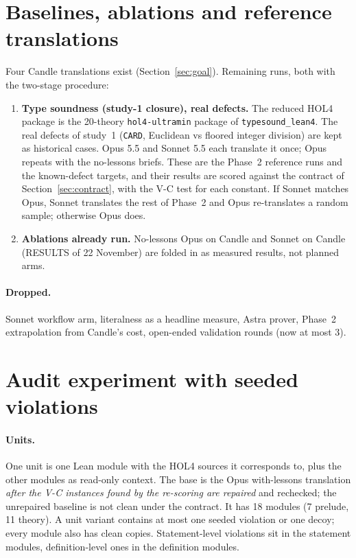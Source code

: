 \documentclass[11pt,a4paper]{article}
\newcommand{\code}[1]{\texttt{#1}}
\begin{document}
\section{Baselines, ablations and reference translations}\label{sec:ablation}
Four Candle translations exist (Section~\ref{sec:goal}). Remaining runs, both with the two-stage procedure:
\begin{enumerate}
\item \textbf{Type soundness (study-1 closure), real defects.} The reduced HOL4 package is the 20-theory \code{hol4-ultramin} package of \code{typesound\_lean4}. The real defects of study~1 (\code{CARD}, Euclidean vs floored integer division) are kept as historical cases. Opus 5.5 and Sonnet 5.5 each translate it once; Opus repeats with the no-lessons briefs. These are the Phase~2 reference runs and the known-defect targets, and their results are scored against the contract of Section~\ref{sec:contract}, with the V-C test for each constant. If Sonnet matches Opus, Sonnet translates the rest of Phase~2 and Opus re-translates a random sample; otherwise Opus does.
\item \textbf{Ablations already run.} No-lessons Opus on Candle and Sonnet on Candle (RESULTS of 22 November) are folded in as measured results, not planned arms.
\end{enumerate}
\paragraph{Dropped.} Sonnet workflow arm, literalness as a headline measure, Astra prover, Phase~2 extrapolation from Candle's cost, open-ended validation rounds (now at most 3).

\section{Audit experiment with seeded violations}\label{sec:audit}
\paragraph{Units.} One unit is one Lean module with the HOL4 sources it corresponds to, plus the other modules as read-only context. The base is the Opus with-lessons translation \emph{after the V-C instances found by the re-scoring are repaired} and rechecked; the unrepaired baseline is not clean under the contract. It has 18 modules (7 prelude, 11 theory). A unit variant contains at most one seeded violation or one decoy; every module also has clean copies. Statement-level violations sit in the statement modules, definition-level ones in the definition modules.
\end{document}
